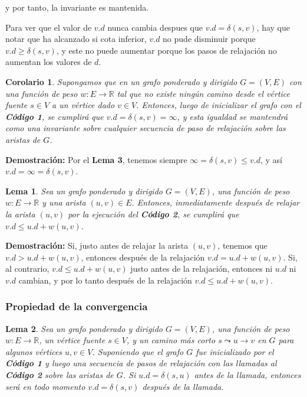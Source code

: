 \documentclass[12pt]{article}
\newcommand{\proof}{\textbf{Demostración:} }
\newcommand{\nl}{\vspace{0.3cm}}
\newtheorem{lemma}{Lema}
\newtheorem{corollary}{Corolario}
\begin{document}
y por tanto, la invariante es mantenida.

\nl

Para ver que el valor de $v.d$ nunca cambia despues que $v.d = \delta(s, v)$, hay que notar que ha alcanzado si cota inferior, $v.d$ no pude disminuir porque $v.d \geqslant \delta(s, v)$, y este no puede aumentar porque los pasos de relajación no aumentan los valores de $d$.

\begin{corollary}
	Supongamos que en un grafo ponderado y dirigido $G = (V, E)$ con una función de peso $w: E \rightarrow \mathbb{R}$ tal que no existe ningún camino desde el vértice fuente $s \in V$ a un vértice dado $v \in V$. Entonces, luego de inicializar el grafo con el \textbf{Código 1}, se cumplirá que $v.d = \delta(s,v) = \infty$, y esta igualdad se mantendrá como una invariante sobre cualquier secuencia de paso de relajación sobre las aristas de $G$.
\end{corollary}

\proof Por el \textbf{Lema 3}, tenemos siempre $\infty = \delta(s, v) \leqslant v.d$, y así $v.d = \infty = \delta(s, v)$.

\begin{lemma}
	Sea un grafo ponderado y dirigido $G = (V, E)$, una función de peso $w: E \rightarrow \mathbb{R}$ y una arista $(u, v) \in E$. Entonces, inmediatamente después de relajar la arista $(u, v)$ por la ejecución del \textbf{Código 2}, se cumplirá que $v.d \leqslant u.d + w(u, v)$.
\end{lemma}

\proof Si, justo antes de relajar la arista $(u, v)$, tenemos que $v.d > u.d + w(u, v)$, entonces después de la relajación $v.d = u.d + w(u, v)$. Si, al contrario, $v.d \leqslant u.d + w(u, v)$ justo antes de la relajación, entonces ni $u.d$ ni $v.d$ cambian, y por lo tanto después de la relajación $v.d \leqslant u.d + w(u, v)$.

\subsubsection{Propiedad de la convergencia}

\nl

\begin{lemma}
	Sea un grafo ponderado y dirigido $G = (V, E)$, una función de peso $w: E \rightarrow \mathbb{R}$, un vértice fuente $s \in V$, y un camino más corto $s \leadsto u \rightarrow v $ en $G$ para algunos vértices $u, v \in V$. Suponiendo que el grafo $G$ fue inicializado por el \textbf{Código 1} y luego una secuencia de pasos de relajación con las llamadas al \textbf{Código 2} sobre las aristas de $G$. Si $u.d = \delta(s, u)$ antes de la llamada, entonces será en todo momento $v.d = \delta(s, v)$ después de la llamada.
\end{lemma}
\end{document}

